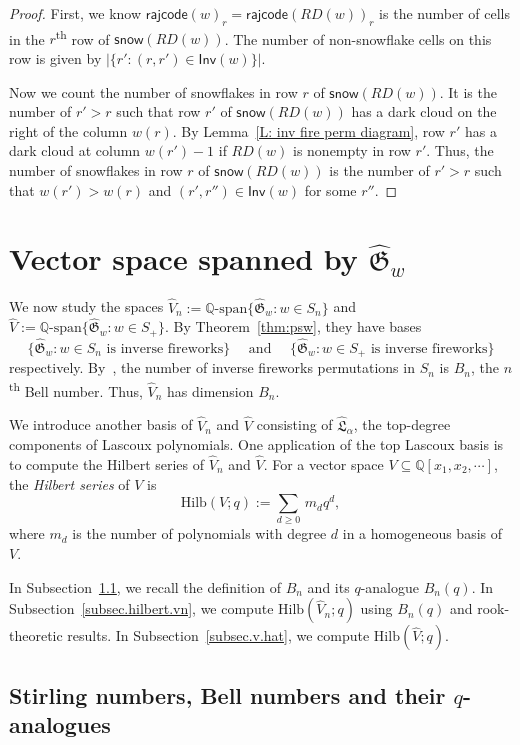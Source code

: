 \documentclass[ALCO]{cedram}
\newcommand{\fG}{\mathfrak{G}}
\newcommand{\fL}{\mathfrak{L}}
\newcommand{\topLas}{\widehat{\fL}}
\newcommand{\topGro}{\widehat{\fG}}
\newcommand{\Q}{\mathbb{Q}}
\newcommand{\snow}{\mathsf{snow}}
\newcommand{\rajcode}{\mathsf{rajcode}}
\newcommand{\Inv}{\mathsf{Inv}}
\newcommand{\definition}[1]{{\color{darkred}\emph{#1}}}
\newcommand{\Hilb}{\mathrm{Hilb}}
\begin{document}
\begin{proof}
First, we know $\rajcode(w)_r = \rajcode(RD(w))_r$
is the number of cells in the $r$\textsuperscript{th}  row of $\snow(RD(w))$.
The number of non-snowflake cells
on this row is given by $|\{r': (r, r') \in \Inv(w)\}|$.

Now we count the number of snowflakes 
in row $r$ of $\snow(RD(w))$.
It is the number of $r' > r$
such that row $r'$ of $\snow(RD(w))$ has a dark cloud
on the right of the column $w(r)$.
By Lemma~\ref{L: inv fire perm diagram}, 
row $r'$ has a dark cloud 
at column $w(r') - 1$ if $RD(w)$ is nonempty in row $r'$.
Thus, the number of snowflakes 
in row $r$ of $\snow(RD(w))$ is the number of $r' > r$
such that $w(r') > w(r)$ and $(r', r'') \in \Inv(w)$
for some $r''$.
\end{proof}


\section{Vector space spanned by \texorpdfstring{$\topGro_w$}{TEXT}}\label{S: Space}

We now study the spaces
$\widehat{V}_n := \Q\textrm{-span}\{\topGro_w: w \in S_n\}$
and $\widehat{V} := \Q\textrm{-span}\{\topGro_w: w \in S_+\}$.
By Theorem~\ref{thm:psw},
they have bases
$$\{\topGro_w: w \in S_n 
\textrm{ is inverse fireworks}\}  
\quad\textrm{ and }\quad 
\{\topGro_w: w \in S_+ \textrm{ is inverse fireworks}\}
$$
respectively. 
By~\cite{Cla}, 
the number of inverse fireworks permutations in $S_n$
is $B_n$, the $n$\textsuperscript{th} Bell number.
Thus, $\widehat{V}_n$ has dimension $B_n$.

We introduce another basis of $\widehat{V}_n$ and $\widehat{V}$ 
consisting of $\topLas_\alpha$, the top-degree components of Lascoux polynomials.
One application of 
the top Lascoux basis 
is to compute the Hilbert series of $\widehat{V}_n$
and $\widehat{V}$.
For a vector space $V \subseteq \Q[x_1, x_2, \cdots]$,
the \definition{Hilbert series} of $V$ is 
$$\Hilb(V;q) := \sum_{d \geq 0}\, m_d q^d,$$
where $m_d$ is the number of polynomials 
with degree $d$ in a homogeneous 
basis of $V$.


In Subsection~\ref{SS: Bell},
we recall the definition of $B_n$ and its $q$-analogue $B_n(q)$. 
In Subsection~\ref{subsec.hilbert.vn}, we compute $\Hilb(\widehat{V}_n;q)$ 
using $B_n(q)$ and rook-theoretic results. 
In Subsection~\ref{subsec.v.hat},
we compute $\Hilb(\widehat{V};q)$.


\subsection{Stirling numbers, Bell numbers
and their \texorpdfstring{$q$}{TEXT}-analogues}
\label{SS: Bell}
\end{document}
